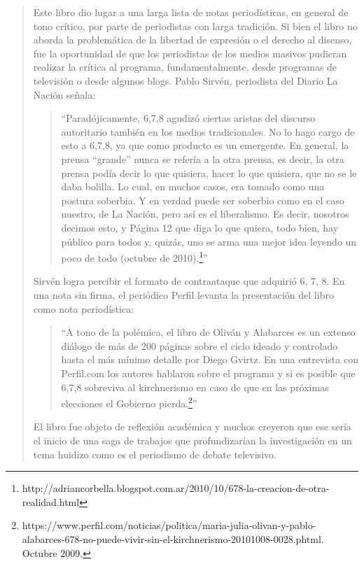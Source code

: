 \begin{quote}
Este libro dio lugar a una larga lista de notas periodísticas, en general de tono crítico, por parte de periodistas con larga tradición. Si bien el libro no aborda la problemática de la libertad de expresión o el derecho al disenso, fue la oportunidad de que los periodistas de los medios masivos pudieran realizar la crítica al programa, fundamentalmente, desde programas de televisión o desde algunos blogs. Pablo Sirvén, periodista del Diario La Nación señala:

\begin{quote}
	\enquote{Paradójicamente, 6,7,8 agudizó ciertas aristas del discurso autoritario también en los medios tradicionales. No lo hago cargo de esto a 6,7,8, ya que como producto es un emergente. En general, la prensa ``grande'' nunca se refería a la otra prensa, es decir, la otra prensa podía decir lo que quisiera, hacer lo que quisiera, que no se le daba bolilla. Lo cual, en muchos casos, era tomado como una postura soberbia. Y en verdad puede ser soberbio como en el caso nuestro, de La Nación, pero así es el liberalismo. Es decir, nosotros decimos esto, y Página 12 que diga lo que quiera, todo bien, hay público para todos y, quizás, uno se arma una mejor idea leyendo un poco de todo (octubre de 2010).\footnote{http://adriancorbella.blogspot.com.ar/2010/10/678-la-creacion-de-otra-realidad.html}}
\end{quote}


Sirvén logra percibir el formato de contraataque que adquirió 6, 7, 8. En una nota sin firma, el periódico Perfil levanta la presentación del libro como nota periodística:

\begin{quote}
	\enquote{A tono de la polémica, el libro de Oliván y Alabarces es un extenso diálogo de más de 200 páginas sobre el ciclo ideado y controlado hasta el más mínimo detalle por Diego Gvirtz. En una entrevista con Perfil.com los autores hablaron sobre el programa y si es posible que 6,7,8 sobreviva al kirchnerismo en caso de que en las próximas elecciones el Gobierno pierda.\footnote{https://www.perfil.com/noticias/politica/maria-julia-olivan-y-pablo-alabarces-678-no-puede-vivir-sin-el-kirchnerismo-20101008-0028.phtml. Octubre 2009.}}
\end{quote}


El libro fue objeto de reflexión académica y muchos creyeron que ese sería el inicio de una saga de trabajos que profundizarían la investigación en un tema huidizo como es el periodismo de debate televisivo.


\end{quote}
